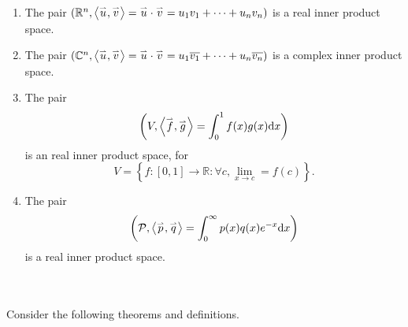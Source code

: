         \begin{enumerate}
            \item The pair \((\mathbb{R}^n, \left\langle \overset{_{\rightharpoonup}}{u},\overset{_{\rightharpoonup}}{v}\right\rangle=\overset{_{\rightharpoonup}}{u}\cdot\overset{_{\rightharpoonup}}{v}=u_1v_1+\cdots+u_nv_n)\) is a real inner product space.
            \item The pair \((\mathbb{C}^n, \left\langle \overset{_{\rightharpoonup}}{u},\overset{_{\rightharpoonup}}{v}\right\rangle=\overset{_{\rightharpoonup}}{u}\cdot\overset{_{\rightharpoonup}}{v}=u_1\overline{v_1}+\cdots+u_n\overline{v_n})\) is a complex inner product space.
            \item The pair 
                \begin{equation*}
                    \left(V,\left\langle \overset{_{\rightharpoonup}}{f},\overset{_{\rightharpoonup}}{g}\right\rangle=\int_0^1 f(x)g(x)\text{d} x\right)
                \end{equation*}
                is an real inner product space, for 
                \begin{equation*}
                    V=\left\{f:[0,1]\to\mathbb{R}:\forall c, \lim_{x\to c}=f(c)\right\}.
                \end{equation*}
            \item The pair
            \begin{equation*}
                \left(\mathcal{P},\left\langle \overset{_{\rightharpoonup}}{p},\overset{_{\rightharpoonup}}{q}\right\rangle=\int_0^\infty p(x)q(x)e^{-x}\text{d} x\right)
            \end{equation*}
            is a real inner product space.
        \end{enumerate}
        \pagebreak
        \vphantom
        \\
        \\
        Consider the following theorems and definitions.
